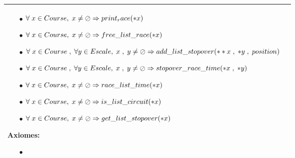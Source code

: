\documentclass[a4paper, 11pt, oneside]{article}
\begin{document}
\begin{tabular}{|p{17cm}|c}
\begin{itemize}
						\item[$\bullet$] $\forall \hspace{1mm} x \in Course,\hspace{1mm} x \neq \oslash \Rightarrow  print_race(*x)$	
						\item[$\bullet$] $\forall \hspace{1mm} x \in Course,\hspace{1mm} x \neq \oslash \Rightarrow  free\_list\_race(*x)$	
						\item[$\bullet$] $\forall \hspace{1mm} x \in Course \hspace{1mm},\hspace{1mm} \forall y \in Escale, \hspace{1mm} x \hspace{1mm} , \hspace{1mm} y  \neq \oslash  \Rightarrow  add\_list\_stopover(**x \hspace{1mm} , \hspace{1mm} *y \hspace{1mm} , \hspace{1mm} position)$			
						\item[$\bullet$] $\forall \hspace{1mm} x \in Course \hspace{1mm},\hspace{1mm} \forall y \in Escale, \hspace{1mm} x \hspace{1mm} , \hspace{1mm} y  \neq \oslash  \Rightarrow  stopover\_race\_time(*x \hspace{1mm} , \hspace{1mm} *y)$			
						\item[$\bullet$] $\forall \hspace{1mm} x \in Course,\hspace{1mm} x \neq \oslash \Rightarrow  race\_list\_time(*x)$	
						\item[$\bullet$] $\forall \hspace{1mm} x \in Course,\hspace{1mm} x \neq \oslash \Rightarrow  is\_list\_circuit(*x)$	
						\item[$\bullet$] $\forall \hspace{1mm} x \in Course,\hspace{1mm} x \neq \oslash \Rightarrow  get\_list\_stopover(*x)$	
					\end{itemize}
					
				\textbf{Axiomes:}
					\begin{itemize}
						\item[$\bullet$]
					\end{itemize}
					
				\\	
				\hline
			\end{tabular}
		
\end{document}
